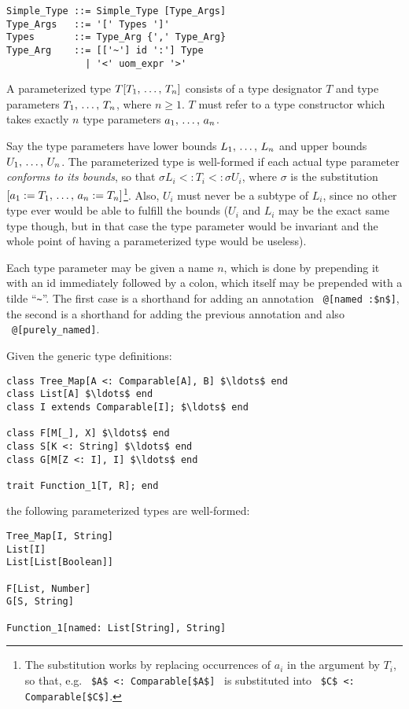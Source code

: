 \syntax\begin{lstlisting}
Simple_Type ::= Simple_Type [Type_Args]
Type_Args   ::= '[' Types ']'
Types       ::= Type_Arg {',' Type_Arg}
Type_Arg    ::= [['~'] id ':'] Type 
              | '<' uom_expr '>'
\end{lstlisting}

A parameterized type $T[T_1 ,\, \ldots ,\, T_n]$ consists of a type designator $T$ and type parameters $T_1 ,\, \ldots ,\, T_n$, where $n \geq 1$. $T$ must refer to a type constructor which takes exactly $n$ type parameters $a_1 ,\, \ldots ,\, a_n$. 

Say the type parameters have lower bounds $L_1 ,\, \ldots ,\, L_n$ and upper bounds $U_1 ,\, \ldots ,\, U_n$. The parameterized type is well-formed if each actual type parameter {\em conforms to its bounds}, so that $\sigma L_i <: T_i <: \sigma U_i$, where $\sigma$ is the substitution $[a_1 := T_1 ,\, \ldots ,\, a_n := T_n]$\footnote{The substitution works by replacing occurrences of $a_i$ in the argument by $T_i$, so that, e.g. ~\lstinline!$A$ <: Comparable[$A$]!~ is substituted into ~\lstinline!$C$ <: Comparable[$C$]!.}. Also, $U_i$ must never be a subtype of $L_i$, since no other type ever would be able to fulfill the bounds ($U_i$ and $L_i$ may be the exact same type though, but in that case the type parameter would be invariant and the whole point of having a parameterized type would be useless). 

Each type parameter may be given a name $n$, which is done by prepending it with an id immediately followed by a colon, which itself may be prepended with a tilde ``\lstinline!~!''. The first case is a shorthand for adding an annotation ~\lstinline!@[named :$n$]!, the second is a shorthand for adding the previous annotation and also ~\lstinline!@[purely_named]!. 

\example
\label{example:parameterized-types}
Given the generic type definitions: 

\begin{lstlisting}
class Tree_Map[A <: Comparable[A], B] $\ldots$ end
class List[A] $\ldots$ end
class I extends Comparable[I]; $\ldots$ end

class F[M[_], X] $\ldots$ end
class S[K <: String] $\ldots$ end
class G[M[Z <: I], I] $\ldots$ end

trait Function_1[T, R]; end
\end{lstlisting}

the following parameterized types are well-formed: 

\begin{lstlisting}
Tree_Map[I, String]
List[I]
List[List[Boolean]]

F[List, Number]
G[S, String]

Function_1[named: List[String], String]
\end{lstlisting}

